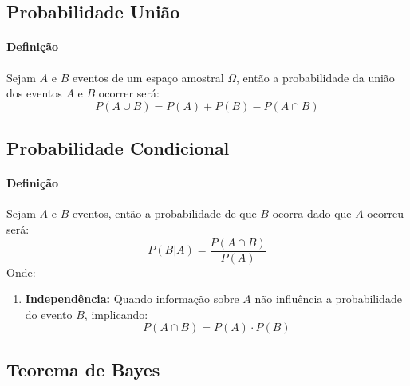 \documentclass{article}
\begin{document}
        \subsection{Probabilidade União}
            \paragraph{Definição}Sejam $A$ e $B$ eventos de um espaço amostral $\Omega$, então a probabilidade da união dos eventos $A$ e $B$ ocorrer será:
                \begin{equation}
                    \boxed{
                        P(A \cup B) = P(A) + P(B) - P(A \cap B)
                    }
                \end{equation}

        \subsection{Probabilidade Condicional}
            \paragraph{Definição}Sejam $A$ e $B$ eventos, então a probabilidade de que $B$ ocorra dado que $A$ ocorreu será:
                \begin{equation}
                    \boxed{
                        P(B|A) = \frac{P(A\cap B)}{P(A)}
                    }
                \end{equation}
            Onde:
                \begin{enumerate}[rightmargin = \leftmargin, noitemsep]
                    \item \textbf{Independência:} Quando informação sobre $A$ não influência a probabilidade do evento $B$, implicando:
                        \begin{equation}
                            \boxed{
                                P(A\cap B) = P(A) \cdot P(B)
                            }
                        \end{equation} 
                \end{enumerate}

        \subsection{Teorema de Bayes}
\end{document}
